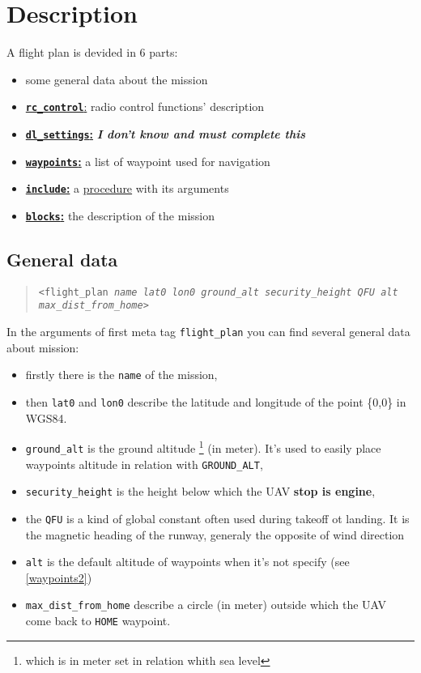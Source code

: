 \documentclass{article}
\renewcommand{\tt}[1]{\texttt{#1}}
\begin{document}
\section{Description}

A flight plan is devided in 6 parts:
\begin{itemize}
	\item some general data about the mission
	\item \hyperlink{rccontrol}{\textbf{\tt{rc\_control}}:} radio control functions' description
	\item \hyperlink{dlsettings}{\textbf{\tt{dl\_settings}:}} \emph{\textbf{I don't know and must complete this}}
	\item \hyperlink{waypoints}{\textbf{\tt{waypoints}:}} a list of waypoint used for navigation
	\item \hyperlink{include}{\textbf{\tt{include}:}} a \hyperlink{procedures}{procedure} with its arguments
	\item \hyperlink{blocks}{\textbf{\tt{blocks}:}} the description of the mission
\end{itemize}


\hypertarget{generaldata}{\subsection{General data}}

\begin{quote}
	\tt{<flight\_plan \emph{name lat0 lon0 ground\_alt security\_height QFU alt max\_dist\_from\_home}>}
\end{quote}
\par
\par

In the arguments of first meta tag \tt{flight\_plan} you can find several general data about mission:
\begin{itemize}
	\item firstly there is the \tt{name} of the mission,
	\item then \tt{lat0} and \tt{lon0} describe the latitude and longitude of the point \{0,0\} in WGS84.
	\item \tt{ground\_alt} is the ground altitude%
	\footnote{which is in meter set in relation whith sea level} (in meter).
	It's used to easily place waypoints altitude in relation with \tt{GROUND\_ALT},
	\item \tt{security\_height} is the height below which the UAV \textbf{stop is engine},
	\item the \tt{QFU} is a kind of global constant often used during takeoff ot landing. It is the magnetic heading of the runway, generaly the opposite of wind direction
	\item \tt{alt} is the default altitude of waypoints when it's not specify (see \autoref{waypoints2})
	\item \tt{max\_dist\_from\_home} describe a circle (in meter) outside which the UAV come back to \tt{HOME} waypoint.
\end{itemize}
\end{document}
